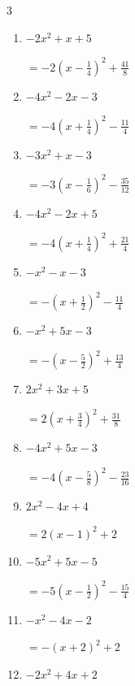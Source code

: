 \begin{multicols}{3}
\begin{enumerate}
        $\displaystyle =2\left( x+1\right)^{2}-7$

  \item $-2x^{2}+x+5$

        $\displaystyle =-2\left( x-\frac{1}{4}\right)^{2}+\frac{41}{8}$

  \item $-4x^{2}-2x-3$

        $\displaystyle =-4\left( x+\frac{1}{4}\right)^{2}-\frac{11}{4}$

\columnbreak %

  \item $-3x^{2}+x-3$

        $\displaystyle =-3\left( x-\frac{1}{6}\right)^{2}-\frac{35}{12}$

  \item $-4x^{2}-2x+5$

        $\displaystyle =-4\left( x+\frac{1}{4}\right)^{2}+\frac{21}{4}$

  \item $-x^{2}-x-3$

        $\displaystyle =-\left( x+\frac{1}{2}\right)^{2}-\frac{11}{4}$

  \item $-x^{2}+5x-3$

        $\displaystyle =-\left( x-\frac{5}{2}\right)^{2}+\frac{13}{4}$

  \item $2x^{2}+3x+5$

        $\displaystyle =2\left( x+\frac{3}{4}\right)^{2}+\frac{31}{8}$

\columnbreak %

\resetques

  \item $-4x^{2}+5x-3$

        $\displaystyle =-4\left( x-\frac{5}{8}\right)^{2}-\frac{23}{16}$

  \item $2x^{2}-4x+4$

        $\displaystyle =2\left( x-1\right)^{2}+2$

  \item $-5x^{2}+5x-5$

        $\displaystyle =-5\left( x-\frac{1}{2}\right)^{2}-\frac{15}{4}$

  \item $-x^{2}-4x-2$

        $\displaystyle =-\left( x+2\right)^{2}+2$

  \item $-2x^{2}+4x+2$


\end{enumerate}
\end{multicols}
